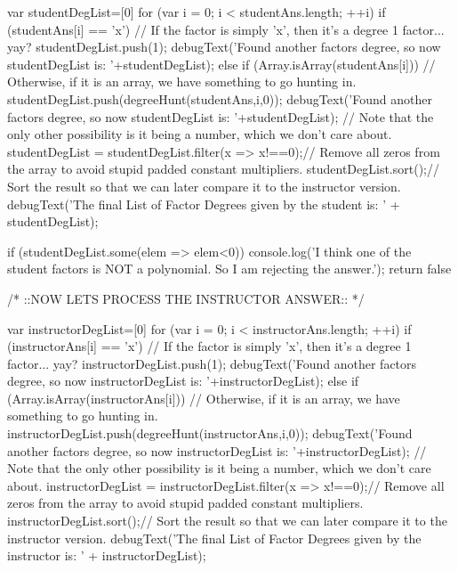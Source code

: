 \begin{javascript}
{    var studentDegList=[0]
    for (var i = 0; i < studentAns.length; ++i) {
        if (studentAns[i] == 'x') {
            // If the factor is simply 'x', then it's a degree 1 factor... yay?
            studentDegList.push(1);
            debugText('Found another factors degree, so now studentDegList is: '+studentDegList); 
        } else if (Array.isArray(studentAns[i])) {
            // Otherwise, if it is an array, we have something to go hunting in.
            studentDegList.push(degreeHunt(studentAns,i,0));
            debugText('Found another factors degree, so now studentDegList is: '+studentDegList); 
        }// Note that the only other possibility is it being a number, which we don't care about.
    }
    studentDegList = studentDegList.filter(x => x!==0);// Remove all zeros from the array to avoid stupid padded constant multipliers.
    studentDegList.sort();// Sort the result so that we can later compare it to the instructor version.
    debugText('The final List of Factor Degrees given by the student is: ' + studentDegList);
    
    if (studentDegList.some(elem => elem<0)) {
        console.log('I think one of the student factors is NOT a polynomial. So I am rejecting the answer.');
        return false
        }
    
    
    /*
        ::NOW LETS PROCESS THE INSTRUCTOR ANSWER::
    */
    
    var instructorDegList=[0]
    for (var i = 0; i < instructorAns.length; ++i) {
        if (instructorAns[i] == 'x') {
            // If the factor is simply 'x', then it's a degree 1 factor... yay?
            instructorDegList.push(1);
            debugText('Found another factors degree, so now instructorDegList is: '+instructorDegList); 
        } else if (Array.isArray(instructorAns[i])) {
            // Otherwise, if it is an array, we have something to go hunting in.
            instructorDegList.push(degreeHunt(instructorAns,i,0));
            debugText('Found another factors degree, so now instructorDegList is: '+instructorDegList); 
        }// Note that the only other possibility is it being a number, which we don't care about.
    }
    instructorDegList = instructorDegList.filter(x => x!==0);// Remove all zeros from the array to avoid stupid padded constant multipliers.
    instructorDegList.sort();// Sort the result so that we can later compare it to the instructor version.
    debugText('The final List of Factor Degrees given by the instructor is: ' + instructorDegList);
    
}
\end{javascript}
